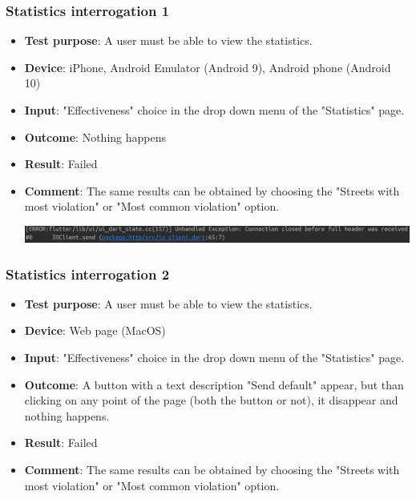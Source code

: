 \documentclass[../ATD.tex]{subfiles}
\begin{document}
    \subsubsection{Statistics interrogation 1}\label{subsubsec:statistics-interrogation-1}
    \begin{itemize}
        \item \textbf{Test purpose}: A user must be able to view the statistics.
        \item \textbf{Device}: iPhone, Android Emulator (Android 9), Android phone (Android 10)
        \item \textbf{Input}: "Effectiveness" choice in the drop down menu of the "Statistics" page.
        \item \textbf{Outcome}: Nothing happens
        \item \textbf{Result}: Failed
        \item \textbf{Comment}: The same results can be obtained by choosing the "Streets with most violation" or "Most common violation" option.

        \includegraphics[scale = 0.3]{assets/statsError.png}
    \end{itemize}

    \subsubsection{Statistics interrogation 2}\label{subsec:statistics-interrogation-2}
    \begin{itemize}
        \item \textbf{Test purpose}: A user must be able to view the statistics.
        \item \textbf{Device}: Web page (MacOS)
        \item \textbf{Input}: "Effectiveness" choice in the drop down menu of the "Statistics" page.
        \item \textbf{Outcome}: A button with a text description "Send default" appear, but than clicking on any point of the page (both the button or not), it disappear and nothing happens.
        \item \textbf{Result}: Failed
        \item \textbf{Comment}: The same results can be obtained by choosing the "Streets with most violation" or "Most common violation" option.
    \end{itemize}
\end{document}
